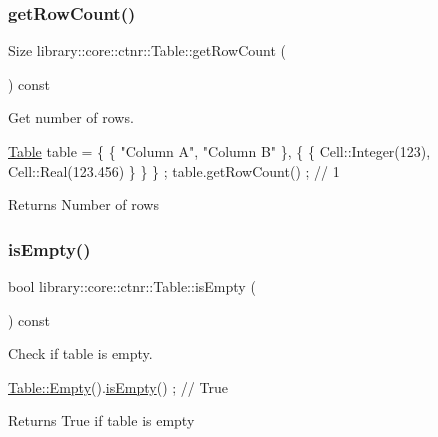 \subsubsection{\texorpdfstring{get\+Row\+Count()}{getRowCount()}}
{\footnotesize\ttfamily Size library\+::core\+::ctnr\+::\+Table\+::get\+Row\+Count (\begin{DoxyParamCaption}{ }\end{DoxyParamCaption}) const}



Get number of rows. 


\begin{DoxyCode}
\hyperlink{classlibrary_1_1core_1_1ctnr_1_1_table_a5b11121caa4288c3da642af7c6a5a632}{Table} table = \{ \{ \textcolor{stringliteral}{"Column A"}, \textcolor{stringliteral}{"Column B"} \}, \{ \{ Cell::Integer(123), Cell::Real(123.456) \} \} \} ;
table.getRowCount() ; \textcolor{comment}{// 1}
\end{DoxyCode}


\begin{DoxyReturn}{Returns}
Number of rows 
\end{DoxyReturn}
\mbox{\label{classlibrary_1_1core_1_1ctnr_1_1_table_ae0b9f9ee022ed72e06ed41f324855c1a}} 
\subsubsection{\texorpdfstring{is\+Empty()}{isEmpty()}}
{\footnotesize\ttfamily bool library\+::core\+::ctnr\+::\+Table\+::is\+Empty (\begin{DoxyParamCaption}{ }\end{DoxyParamCaption}) const}



Check if table is empty. 


\begin{DoxyCode}
\hyperlink{classlibrary_1_1core_1_1ctnr_1_1_table_ada8d9997351d5aea25ae8e563eedeb1c}{Table::Empty}().\hyperlink{classlibrary_1_1core_1_1ctnr_1_1_table_ae0b9f9ee022ed72e06ed41f324855c1a}{isEmpty}() ; \textcolor{comment}{// True}
\end{DoxyCode}


\begin{DoxyReturn}{Returns}
True if table is empty 
\end{DoxyReturn}
\mbox{\label{classlibrary_1_1core_1_1ctnr_1_1_table_a423b5a739e3ed0127bc14572042c158e}} 

